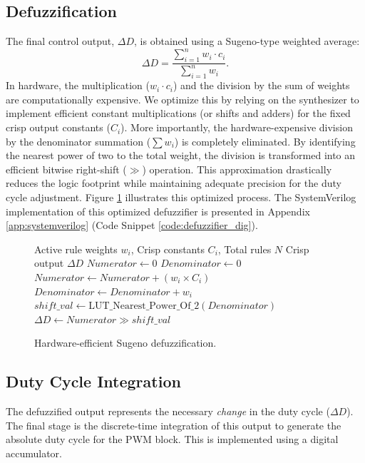 \documentclass[a4paper,oneside,12pt]{report}
\numberwithin{equation}{chapter}
\begin{document}
\subsection{Defuzzification}
The final control output, $\Delta D$, is obtained using a Sugeno-type weighted average:
\begin{equation}
    \Delta D = \frac{\sum_{i=1}^{n} w_i \cdot c_i}{\sum_{i=1}^{n} w_i}.
\end{equation}
In hardware, the multiplication ($w_i \cdot c_i$) and the division by the sum of weights are computationally expensive. We optimize this by relying on the synthesizer to implement efficient constant multiplications (or shifts and adders) for the fixed crisp output constants ($C_i$). More importantly, the hardware-expensive division by the denominator summation ($\sum w_i$) is completely eliminated. By identifying the nearest power of two to the total weight, the division is transformed into an efficient bitwise right-shift ($\gg$) operation. This approximation drastically reduces the logic footprint while maintaining adequate precision for the duty cycle adjustment. Figure \ref{alg:defuzzification} illustrates this optimized process. The SystemVerilog implementation of this optimized defuzzifier is presented in Appendix \ref{app:systemverilog} (Code Snippet \ref{code:defuzzifier_dig}).

\begin{figure}[H]
    \begin{algorithmic}[1]
\REQUIRE Active rule weights $w_i$, Crisp constants $C_i$, Total rules $N$
\ENSURE Crisp output $\Delta D$
\STATE $Numerator \leftarrow 0$
\STATE $Denominator \leftarrow 0$
    \STATE $Numerator \leftarrow Numerator + (w_i \times C_i)$
    \STATE $Denominator \leftarrow Denominator + w_i$
\ENDFOR
\STATE $shift\_val \leftarrow \text{LUT\_Nearest\_Power\_Of\_2}(Denominator)$
\STATE $\Delta D \leftarrow Numerator \gg shift\_val$
\end{algorithmic}
    \vspace{\baselineskip}
    \caption{Hardware-efficient Sugeno defuzzification.}\label{alg:defuzzification}
\end{figure}

\subsection{Duty Cycle Integration}
The defuzzified output represents the necessary \textit{change} in the duty cycle ($\Delta D$). The final stage is the discrete-time integration of this output to generate the absolute duty cycle for the PWM block. This is implemented using a digital accumulator.
\end{document}
